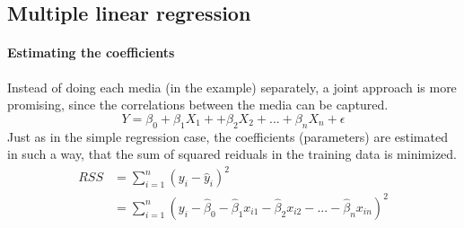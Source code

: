 \documentclass[../document.tex]{subfiles}
\begin{document}
	\subsection{Multiple linear regression}	
	\paragraph{Estimating the coefficients}
	Instead of doing each media (in the example) separately, a joint approach is more promising, since the correlations between the media can be captured.
	\begin{equation}
		Y = \beta_{0}+\beta_{1}X_{1}++\beta_{2}X_{2}+...+\beta_{n}X_{n}+\epsilon
	\end{equation}
	Just as in the simple regression case, the coefficients (parameters) are estimated in such a way, that the sum of squared reiduals in the training data is minimized.
	\begin{equation}
	\begin{split}
		RSS &= \sum_{i=1}^{n}(y_{i}-\hat{y}_{i})^2\\
			&= \sum_{i=1}^{n}(y_{i}-\hat{\beta}_{0}-\hat{\beta}_{1}x_{i1}-\hat{\beta}_{2}x_{i2}-...-\hat{\beta}_{n}x_{in})^2
	\end{split}
	\end{equation}
\end{document}
